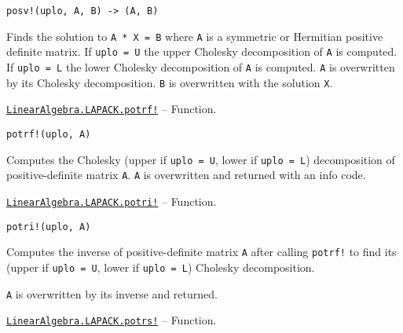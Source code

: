 \begin{adjustwidth}{2em}{0pt}


\begin{verbatim}
posv!(uplo, A, B) -> (A, B)
\end{verbatim}

Finds the solution to \texttt{A * X = B} where \texttt{A} is a symmetric or Hermitian positive definite matrix. If \texttt{uplo = U} the upper Cholesky decomposition of \texttt{A} is computed. If \texttt{uplo = L} the lower Cholesky decomposition of \texttt{A} is computed. \texttt{A} is overwritten by its Cholesky decomposition. \texttt{B} is overwritten with the solution \texttt{X}.



\end{adjustwidth}
\hypertarget{15056431266921985441}{}
\hyperlink{15056431266921985441}{\texttt{LinearAlgebra.LAPACK.potrf!}}  -- {Function.}

\begin{adjustwidth}{2em}{0pt}


\begin{verbatim}
potrf!(uplo, A)
\end{verbatim}

Computes the Cholesky (upper if \texttt{uplo = U}, lower if \texttt{uplo = L}) decomposition of positive-definite matrix \texttt{A}. \texttt{A} is overwritten and returned with an info code.



\end{adjustwidth}
\hypertarget{17784788688709608363}{}
\hyperlink{17784788688709608363}{\texttt{LinearAlgebra.LAPACK.potri!}}  -- {Function.}

\begin{adjustwidth}{2em}{0pt}


\begin{verbatim}
potri!(uplo, A)
\end{verbatim}

Computes the inverse of positive-definite matrix \texttt{A} after calling \texttt{potrf!} to find its (upper if \texttt{uplo = U}, lower if \texttt{uplo = L}) Cholesky decomposition.

\texttt{A} is overwritten by its inverse and returned.



\end{adjustwidth}
\hypertarget{13026081165818770600}{}
\hyperlink{13026081165818770600}{\texttt{LinearAlgebra.LAPACK.potrs!}}  -- {Function.}

